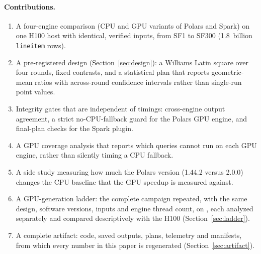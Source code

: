 \documentclass[sigconf, nonacm]{acmart}
\begin{document}
\paragraph{Contributions.}
\begin{enumerate}
  \item A four-engine comparison (CPU and GPU variants of Polars and Spark) on
    one H100 host with identical, verified inputs, from SF1 to SF300
    (1.8~billion \texttt{lineitem} rows).
  \item A pre-registered design (Section~\ref{sec:design}): a Williams Latin
    square over four rounds, fixed contrasts, and a statistical plan that
    reports geometric-mean ratios with across-round confidence intervals rather
    than single-run point values.
  \item Integrity gates that are independent of timings: cross-engine output
    agreement, a strict no-CPU-fallback guard for the Polars GPU engine, and
    final-plan checks for the Spark plugin.
  \item A GPU coverage analysis that reports which queries cannot run on each
    GPU engine, rather than silently timing a CPU fallback.
  \item A side study measuring how much the Polars version (1.44.2 versus
    2.0.0) changes the CPU baseline that the GPU speedup is measured against.
\ifladderran
  \item A GPU-generation ladder: the complete campaign repeated, with the same
    design, software versions, inputs and engine thread count, on
    , each analyzed separately and compared
    descriptively with the H100 (Section~\ref{sec:ladder}).
\fi
  \item A complete artifact: code, saved outputs, plans, telemetry and
    manifests, from which every number in this paper is regenerated
    (Section~\ref{sec:artifact}).
\end{enumerate}
\end{document}
